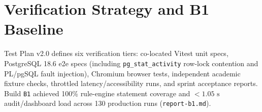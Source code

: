 \documentclass{article}
\begin{document}
\section{Verification Strategy and B1 Baseline}
Test Plan v2.0 defines six verification tiers: co-located Vitest unit specs, PostgreSQL 18.6 e2e specs (including
\texttt{pg\_stat\_activity} row-lock contention and PL/pgSQL fault injection), Chromium browser tests, independent academic
fixture checks, throttled latency/accessibility runs, and sprint acceptance reports. Build \texttt{B1} achieved 100\%
rule-engine statement coverage and $< 1.05\text{ s}$ audit/dashboard load across 130 production runs (\texttt{report-b1.md}).
\end{document}
